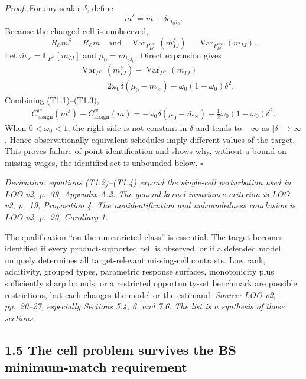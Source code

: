 \documentclass[11pt]{article}
\begin{document}
\textit{Proof.}
For any scalar \(\delta\), define
\[
m^\delta=m+\delta e_{i_0j_0}.
\]
Because the changed cell is unobserved,
\[
R_{\mathcal E}m^\delta=R_{\mathcal E}m
\quad\text{and}\quad
\operatorname{Var}_{P^{\mathrm{obs}}_{IJ}}(m^\delta_{IJ})
=\operatorname{Var}_{P^{\mathrm{obs}}_{IJ}}(m_{IJ}).
\tag{T1.2}
\]
Let \(\bar m_\times=\mathbb E_{P^\times}[m_{IJ}]\) and
\(\mu_0=m_{i_0j_0}\).  Direct expansion gives
\[
\begin{aligned}
&\operatorname{Var}_{P^\times}(m^\delta_{IJ})
-\operatorname{Var}_{P^\times}(m_{IJ})\\
&\qquad
=2\omega_0\delta(\mu_0-\bar m_\times)
+\omega_0(1-\omega_0)\delta^2.
\end{aligned}
\tag{T1.3}
\]
Combining (T1.1)--(T1.3),
\[
\begin{aligned}
C^w_{\mathrm{assign}}(m^\delta)
-C^w_{\mathrm{assign}}(m)
=-\omega_0\delta(\mu_0-\bar m_\times)
-\frac12\omega_0(1-\omega_0)\delta^2.
\end{aligned}
\tag{T1.4}
\]
When \(0<\omega_0<1\), the right side is not constant in \(\delta\) and tends
to \(-\infty\) as \(|\delta|\to\infty\).  Hence observationally equivalent
schedules imply different values of the target.  This proves failure of point
identification and shows why, without a bound on missing wages, the identified
set is unbounded below. \(\square\)

\textit{Derivation: equations (T1.2)--(T1.4) expand the single-cell
perturbation used in LOO-v2, p.\ 39, Appendix A.2.  The general
kernel-invariance criterion is LOO-v2, p.\ 19, Proposition 4.  The
nonidentification and unboundedness conclusion is LOO-v2, p.\ 20,
Corollary 1.}

The qualification ``on the unrestricted class'' is essential.  The target
becomes identified if every product-supported cell is observed, or if a
defended model uniquely determines all target-relevant missing-cell contrasts.
Low rank, additivity, grouped types, parametric response surfaces, monotonicity
plus sufficiently sharp bounds, or a restricted opportunity-set benchmark are
possible restrictions, but each changes the model or the estimand.
\textit{Source: LOO-v2, pp.\ 20--27, especially Sections 5.4, 6, and 7.6.
The list is a synthesis of those sections.}

\subsection{1.5 The cell problem survives the BS minimum-match requirement}
\end{document}
